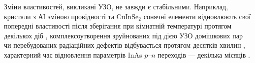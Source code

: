%
%
%
%
%
%
%
%
%


Зміни властивостей, викликані УЗО, не завжди є стабільними.
Наприклад, кристали з АІ зміною провідності та  CuInSe$_2$ сонячні елементи відновлюють свої попередні властивості після зберігання при кімнатній температурі протягом декількох діб \cite{YOlikh2006TPLr,US:ZnCdTe,BorkovFTT,OstapSC},
комплексоутворення зруйнованих під дією УЗО домішкових пар чи перебудованих радіаційних дефектів відбувається протягом десятків хвилин \cite{Ostapenko1995SST,Ostapenko1995,YOlikh2006TPLr},
характерний час відновлення параметрів InAs $p$--$n$ переходів --- декілька місяців \cite{Teterkin2009r}.



